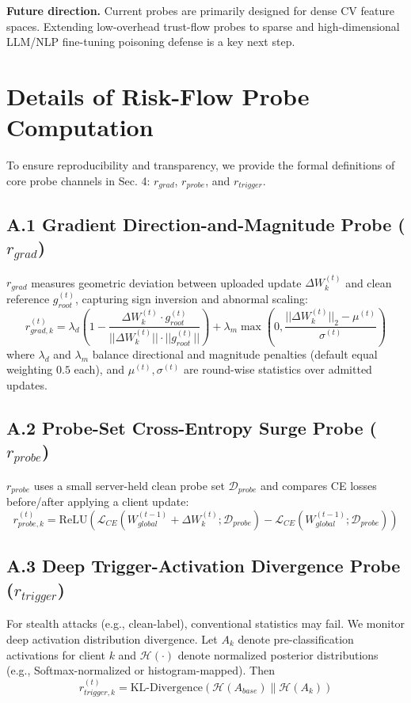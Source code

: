 \documentclass[runningheads]{llncs}
\begin{document}
\textbf{Future direction.} Current probes are primarily designed for dense CV feature spaces. Extending low-overhead trust-flow probes to sparse and high-dimensional LLM/NLP fine-tuning poisoning defense is a key next step.

\appendix
\section{Details of Risk-Flow Probe Computation}
To ensure reproducibility and transparency, we provide the formal definitions of core probe channels in Sec. 4: $r_{grad}$, $r_{probe}$, and $r_{trigger}$.

\subsection{A.1 Gradient Direction-and-Magnitude Probe ($r_{grad}$)}
$r_{grad}$ measures geometric deviation between uploaded update $\Delta W_k^{(t)}$ and clean reference $g_{root}^{(t)}$, capturing sign inversion and abnormal scaling:
\begin{equation}
    r_{grad, k}^{(t)} = \lambda_{d} \left(1 - \frac{\Delta W_k^{(t)} \cdot g_{root}^{(t)}}{||\Delta W_k^{(t)}|| \cdot ||g_{root}^{(t)}||}\right) + \lambda_{m} \max\left(0, \frac{||\Delta W_k^{(t)}||_2 - \mu^{(t)}}{\sigma^{(t)}}\right)
\end{equation}
where $\lambda_d$ and $\lambda_m$ balance directional and magnitude penalties (default equal weighting $0.5$ each), and $\mu^{(t)},\sigma^{(t)}$ are round-wise statistics over admitted updates.

\subsection{A.2 Probe-Set Cross-Entropy Surge Probe ($r_{probe}$)}
$r_{probe}$ uses a small server-held clean probe set $\mathcal{D}_{probe}$ and compares CE losses before/after applying a client update:
\begin{equation}
    r_{probe, k}^{(t)} = \text{ReLU}\left( \mathcal{L}_{CE}(W_{global}^{(t-1)} + \Delta W_k^{(t)}; \mathcal{D}_{probe}) - \mathcal{L}_{CE}(W_{global}^{(t-1)}; \mathcal{D}_{probe}) \right)
\end{equation}

\subsection{A.3 Deep Trigger-Activation Divergence Probe ($r_{trigger}$)}
For stealth attacks (e.g., clean-label), conventional statistics may fail. We monitor deep activation distribution divergence. Let $A_k$ denote pre-classification activations for client $k$ and $\mathcal{H}(\cdot)$ denote normalized posterior distributions (e.g., Softmax-normalized or histogram-mapped). Then
\begin{equation}
    r_{trigger, k}^{(t)} = \text{KL-Divergence}\left( \mathcal{H}(A_{base}) \| \mathcal{H}(A_k) \right)
\end{equation}
\end{document}
